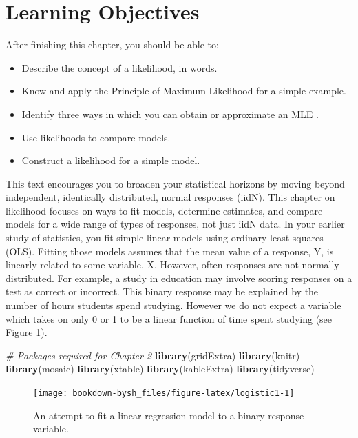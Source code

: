 \documentclass[
]{krantz}
\newenvironment{Shaded}{\begin{snugshade}}{\end{snugshade}}
\newcommand{\CommentTok}[1]{\textcolor[rgb]{0.37,0.37,0.37}{\textit{#1}}}
\newcommand{\KeywordTok}[1]{\textcolor[rgb]{0.27,0.27,0.27}{\textbf{#1}}}
\newcommand{\NormalTok}[1]{#1}
\providecommand{\tightlist}{%
  \setlength{\itemsep}{0pt}\setlength{\parskip}{0pt}}
\begin{document}
\hypertarget{learning-objectives-1}{%
\section{Learning Objectives}\label{learning-objectives-1}}

After finishing this chapter, you should be able to:

\begin{itemize}
\tightlist
\item
  Describe the concept of a likelihood, in words.
\item
  Know and apply the Principle of Maximum Likelihood for a simple example.
\item
  Identify three ways in which you can obtain or approximate an MLE .
\item
  Use likelihoods to compare models.
\item
  Construct a likelihood for a simple model.
\end{itemize}

This text encourages you to broaden your statistical horizons by moving beyond independent, identically distributed, normal responses (iidN). This chapter on likelihood focuses on ways to fit models, determine estimates, and compare models for a wide range of types of responses, not just iidN data. In your earlier study of statistics, you fit simple linear models using ordinary least squares (OLS). Fitting those models assumes that the mean value of a response, Y, is linearly related to some variable, X. However, often responses are not normally distributed. For example, a study in education may involve scoring responses on a test as correct or incorrect. This binary response may be explained by the number of hours students spend studying. However we do not expect a variable which takes on only 0 or 1 to be a linear function of time spent studying (see Figure \ref{fig:logistic1}).

\begin{Shaded}
\begin{Highlighting}[]
\CommentTok{# Packages required for Chapter 2}
\KeywordTok{library}\NormalTok{(gridExtra)  }
\KeywordTok{library}\NormalTok{(knitr) }
\KeywordTok{library}\NormalTok{(mosaic)}
\KeywordTok{library}\NormalTok{(xtable)}
\KeywordTok{library}\NormalTok{(kableExtra)}
\KeywordTok{library}\NormalTok{(tidyverse) }
\end{Highlighting}
\end{Shaded}

\begin{figure}

{\centering \texttt{[image: bookdown-bysh\_files/figure-latex/logistic1-1]} 

}

\caption{An attempt to fit a linear regression model to a binary response variable.}\label{fig:logistic1}
\end{figure}
\end{document}
